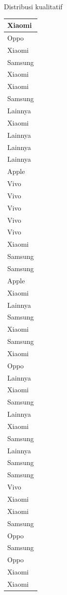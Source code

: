\documentclass[
  ignorenonframetext,
]{beamer}
\begin{document}
\begin{frame}[s]{Distribusi kualitatif}
\begin{table}
\begin{tabular}[t]{l}
\hline
Xiaomi\\
\hline
Oppo\\
\hline
Xiaomi\\
\hline
Samsung\\
\hline
Xiaomi\\
\hline
Xiaomi\\
\hline
Samsung\\
\hline
Lainnya\\
\hline
Xiaomi\\
\hline
Lainnya\\
\hline
Lainnya\\
\hline
Lainnya\\
\hline
Apple\\
\hline
Vivo\\
\hline
Vivo\\
\hline
Vivo\\
\hline
Vivo\\
\hline
Vivo\\
\hline
Xiaomi\\
\hline
Samsung\\
\hline
Samsung\\
\hline
Apple\\
\hline
Xiaomi\\
\hline
Lainnya\\
\hline
Samsung\\
\hline
Xiaomi\\
\hline
Samsung\\
\hline
Xiaomi\\
\hline
Oppo\\
\hline
Lainnya\\
\hline
Xiaomi\\
\hline
Samsung\\
\hline
Lainnya\\
\hline
Xiaomi\\
\hline
Samsung\\
\hline
Lainnya\\
\hline
Samsung\\
\hline
Samsung\\
\hline
Vivo\\
\hline
Xiaomi\\
\hline
Xiaomi\\
\hline
Samsung\\
\hline
Oppo\\
\hline
Samsung\\
\hline
Oppo\\
\hline
Xiaomi\\
\hline
Xiaomi\\

\end{tabular}
\end{table}
\end{frame}
\end{document}
